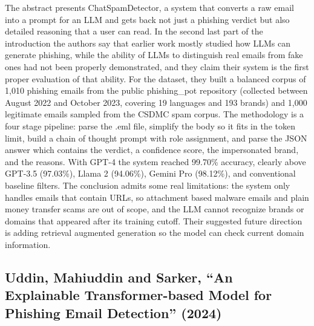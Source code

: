 \documentclass[10pt,a4paper]{article}
\begin{document}
The abstract presents ChatSpamDetector, a system that converts a raw email into a prompt for an LLM and gets back not just a phishing verdict but also detailed reasoning that a user can read. In the second last part of the introduction the authors say that earlier work mostly studied how LLMs can generate phishing, while the ability of LLMs to distinguish real emails from fake ones had not been properly demonstrated, and they claim their system is the first proper evaluation of that ability. For the dataset, they built a balanced corpus of 1,010 phishing emails from the public phishing\_pot repository (collected between August 2022 and October 2023, covering 19 languages and 193 brands) and 1,000 legitimate emails sampled from the CSDMC spam corpus. The methodology is a four stage pipeline: parse the .eml file, simplify the body so it fits in the token limit, build a chain of thought prompt with role assignment, and parse the JSON answer which contains the verdict, a confidence score, the impersonated brand, and the reasons. With GPT-4 the system reached 99.70\% accuracy, clearly above GPT-3.5 (97.03\%), Llama 2 (94.06\%), Gemini Pro (98.12\%), and conventional baseline filters. The conclusion admits some real limitations: the system only handles emails that contain URLs, so attachment based malware emails and plain money transfer scams are out of scope, and the LLM cannot recognize brands or domains that appeared after its training cutoff. Their suggested future direction is adding retrieval augmented generation so the model can check current domain information.

\subsection{Uddin, Mahiuddin and Sarker, ``An Explainable Transformer-based Model for Phishing Email Detection'' (2024)}
\end{document}
